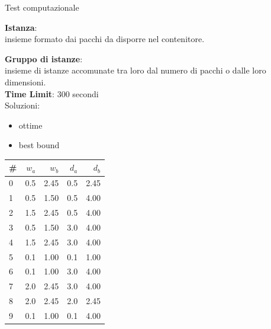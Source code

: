 \documentclass{beamer}
\begin{document}
\begin{frame}{Test computazionale}
	\begin{minipage}[c]{0.45\textwidth}
		\textbf{Istanza}:\\ insieme formato dai pacchi da disporre nel contenitore.
		\vspace{.5cm}
				
		\textbf{Gruppo di istanze}:\\ insieme di istanze accomunate tra loro dal numero di pacchi o dalle loro dimensioni.\\
				
		\textbf{Time Limit}: 300 secondi\\
				
		Soluzioni:
		\begin{itemize}
			\item ottime
			\item best bound
		\end{itemize}
	\end{minipage}
	\hfill
	\begin{minipage}[c]{0.45\textwidth}
		\begin{center}
			\begin{tabular}{l |r|r|r|r}
				\# & $w_a$ & $w_b$ & $d_a$ & $d_b$ \\
				\hline	
				0  & 0.5   & 2.45  & 0.5   & 2.45  \\
				1  & 0.5   & 1.50  & 0.5   & 4.00  \\
				2  & 1.5   & 2.45  & 0.5   & 4.00  \\
				3  & 0.5   & 1.50  & 3.0   & 4.00  \\
				4  & 1.5   & 2.45  & 3.0   & 4.00  \\
				5  & 0.1   & 1.00  & 0.1   & 1.00  \\
				6  & 0.1   & 1.00  & 3.0   & 4.00  \\
				7  & 2.0   & 2.45  & 3.0   & 4.00  \\
				8  & 2.0   & 2.45  & 2.0   & 2.45  \\
				9  & 0.1   & 1.00  & 0.1   & 4.00  \\
			\end{tabular}
		\end{center}
	\end{minipage}
\end{frame}
\end{document}
